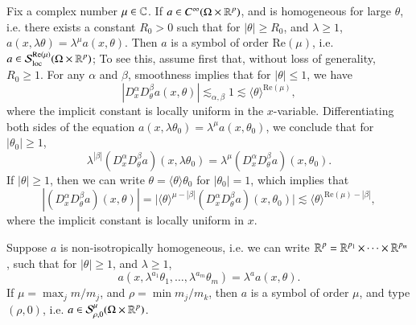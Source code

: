 \begin{example}
    Fix a complex number $\mu \in \operatorname{\mathbb{C}}$. If $a \in C^\infty(\Omega \times \operatorname{\mathbb{R}}^p)$, and is homogeneous for large $\theta$, i.e. there exists a constant $R_0 > 0$ such that for $|\theta| \geq R_0$, and $\lambda \geq 1$, $a(x,\lambda \theta) = \lambda^\mu a(x, \theta)$. Then $a$ is a symbol of order $\text{Re}(\mu)$, i.e. $a \in \mathcal{S}^{\text{Re}(\mu)}_{\text{loc}}(\Omega \times \operatorname{\mathbb{R}}^p)$; To see this, assume first that, without loss of generality, $R_0 \geq 1$. For any $\alpha$ and $\beta$, smoothness implies that for $|\theta| \leq 1$, we have
    \[ |D^\alpha_x D^\beta_\theta a(x,\theta)| \lesssim_{\alpha,\beta} 1 \lesssim \langle \theta \rangle^{\text{Re}(\mu)}, \]
    where the implicit constant is locally uniform in the $x$-variable. Differentiating both sides of the equation $a(x,\lambda \theta_0) = \lambda^\mu a(x,\theta_0)$, we conclude that for $|\theta_0| \geq 1$,
    \[ \lambda^{|\beta|} (D^\alpha_x D^\beta_\theta a)(x,\lambda \theta_0) = \lambda^\mu (D^\alpha_x D^\beta_\theta a)(x,\theta_0). \]
    If $|\theta| \geq 1$, then we can write $\theta = \langle \theta \rangle \theta_0$ for $|\theta_0| = 1$, which implies that
    \[ |(D^\alpha_x D^\beta_\theta a)(x, \theta)| = \Big| \langle \theta \rangle^{\mu - |\beta|} (D^\alpha_x D^\beta_\theta a)(x, \theta_0) \Big| \lesssim \langle \theta \rangle^{\text{Re}(\mu) - |\beta|}, \]
    where the implicit constant is locally uniform in $x$.
\end{example}

\begin{example}
    Suppose $a$ is non-isotropically homogeneous, i.e. we can write $\operatorname{\mathbb{R}}^p = \operatorname{\mathbb{R}}^{p_1} \times \dots \times \operatorname{\mathbb{R}}^{p_m}$, such that for $|\theta| \geq 1$, and $\lambda \geq 1$,
    \[ a(x, \lambda^{a_1} \theta_1, \dots, \lambda^{a_m} \theta_m ) = \lambda^a a(x, \theta). \]
    If $\mu = \max_j m / m_j$, and $\rho = \min m_j / m_k$, then $a$ is a symbol of order $\mu$, and type $(\rho,0)$, i.e. $a \in \mathcal{S}^\mu_{\rho,0}(\Omega \times \operatorname{\mathbb{R}}^p)$.
\end{example}

